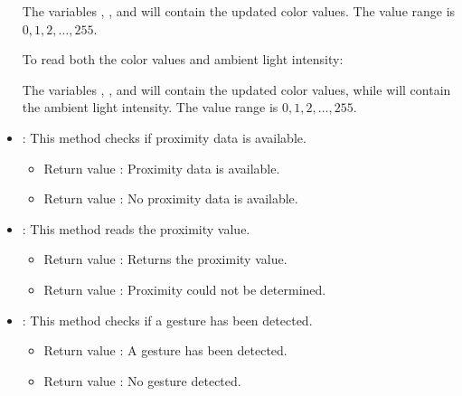 \begin{itemize}
	
	\medskip
	
	The variables , , and  will contain the updated color values. The value range is $0, 1, 2, \ldots, 255$.
	
	\medskip
	
	To read both the color values and ambient light intensity:
	
	
	
	\medskip
	
	The variables , , and  will contain the updated color values, while  will contain the ambient light intensity. The value range is $0, 1, 2, \ldots, 255$.
	
	\item {}: This method checks if proximity data is available.
	
	\medskip
	
	\begin{itemize}
		\item Return value : Proximity data is available.
		\item Return value : No proximity data is available.
	\end{itemize}
	
	\item {}: This method reads the proximity value.
	
	\medskip
	
	\begin{itemize}
		\item Return value : Returns the proximity value.
		\item Return value : Proximity could not be determined.
	\end{itemize}
	
	\item {}: This method checks if a gesture has been detected.
	
	\medskip
	
	\begin{itemize}
		\item Return value : A gesture has been detected.
		\item Return value : No gesture detected.
	\end{itemize}
	

\end{itemize}
